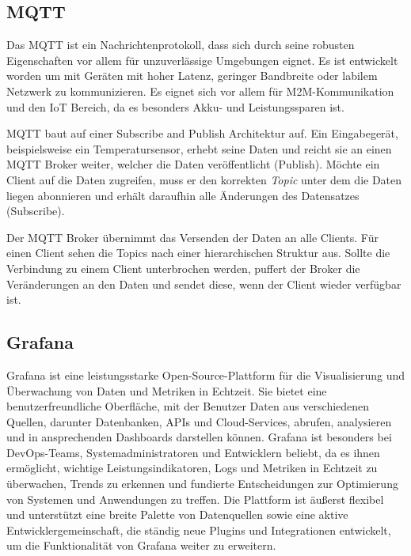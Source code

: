 \documentclass[a4paper, 12pt, oneside, toc=listofnumbered, bibliography=totoc]{scrbook}
\begin{document}
		\subsection{MQTT}
		
		Das \ac{MQTT} ist ein Nachrichtenprotokoll, dass sich durch seine robusten Eigenschaften vor allem für unzuverlässige Umgebungen eignet. Es ist entwickelt worden um mit Geräten mit hoher Latenz, geringer Bandbreite oder labilem Netzwerk zu kommunizieren. Es eignet sich vor allem für \ac{M2M}-Kommunikation und den \ac{IoT} Bereich, da es besonders Akku- und Leistungssparen ist. 
		
		\ac{MQTT} baut auf einer Subscribe and Publish Architektur auf. Ein Eingabegerät, beispielsweise ein Temperatursensor, erhebt seine Daten und reicht sie an einen MQTT Broker weiter, welcher die Daten veröffentlicht (Publish). Möchte ein Client auf die Daten zugreifen, muss er den korrekten \textit{Topic} unter dem die Daten liegen abonnieren und erhält daraufhin alle Änderungen des Datensatzes (Subscribe).
		
		Der \ac{MQTT} Broker übernimmt das Versenden der Daten an alle Clients. Für einen Client sehen die Topics nach einer hierarchischen Struktur aus. Sollte die Verbindung zu einem Client unterbrochen werden, puffert der Broker die Veränderungen an den Daten und sendet diese, wenn der Client wieder verfügbar ist.
		
		\subsection{Grafana}
		
		Grafana ist eine leistungsstarke Open-Source-Plattform für die Visualisierung und Überwachung von Daten und Metriken in Echtzeit. Sie bietet eine benutzerfreundliche Oberfläche, mit der Benutzer Daten aus verschiedenen Quellen, darunter Datenbanken, APIs und Cloud-Services, abrufen, analysieren und in ansprechenden Dashboards darstellen können. Grafana ist besonders bei DevOps-Teams, Systemadministratoren und Entwicklern beliebt, da es ihnen ermöglicht, wichtige Leistungsindikatoren, Logs und Metriken in Echtzeit zu überwachen, Trends zu erkennen und fundierte Entscheidungen zur Optimierung von Systemen und Anwendungen zu treffen. Die Plattform ist äußerst flexibel und unterstützt eine breite Palette von Datenquellen sowie eine aktive Entwicklergemeinschaft, die ständig neue Plugins und Integrationen entwickelt, um die Funktionalität von Grafana weiter zu erweitern. \cite{noauthor_grafana_nodate}
		
\end{document}
